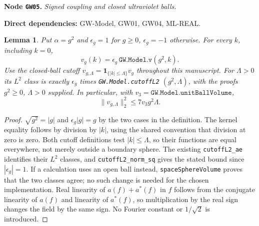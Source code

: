 \documentclass[11pt,a4paper]{article}
\newtheorem{lemma}[theorem]{Lemma}
\theoremstyle{remark}\newtheorem{remark}[theorem]{Remark}
\newcommand{\node}[3]{\par\Needspace{6\baselineskip}\smallskip\hypertarget{node:#1}{}\label{nodepage:#1}\noindent\textbf{Node \texttt{#1}.} \textit{#2.}\par\noindent\textbf{Direct dependencies:} #3.\par}
\begin{document}
\node{GW05}{Signed coupling and closed ultraviolet balls}{GW-Model, GW01, GW04, ML-REAL}
\begin{lemma}\label{lem:gwkerneladapter}
Put $\alpha=g^2$ and $\epsilon_g=1$ for $g\geq0$, $\epsilon_g=-1$ otherwise. For every $k$, including $k=0$,
\[
 v_g(k)=\epsilon_g\,\texttt{GW.Model.v}(g^2,k).
\]
Use the closed-ball cutoff $v_{g,\Lambda}=\mathbf1_{\{|k|\leq\Lambda\}}v_g$ throughout this manuscript. For $\Lambda>0$ its $L^2$ class is exactly $\epsilon_g$ times
\texttt{GW.Model.cutoffL2} $(g^2,\Lambda)$, with the proofs $g^2\geq0$, $\Lambda>0$ supplied. In particular, with $v_3=\texttt{GW.Model.unitBallVolume}$,
\[
 \|v_{g,\Lambda}\|_2^2\leq7v_3g^2\Lambda.
\]
\end{lemma}
\begin{proof}
$\sqrt{g^2}=|g|$ and $\epsilon_g|g|=g$ by the two cases in the definition. The kernel equality follows by division by $|k|$, using the shared convention that division at zero is zero. Both cutoff definitions test $|k|\leq\Lambda$, so their functions are equal everywhere, not merely outside a boundary sphere. The existing \texttt{cutoffL2\_ae} identifies their $L^2$ classes, and \texttt{cutoffL2\_norm\_sq} gives the stated bound since $|\epsilon_g|=1$. If a calculation uses an open ball instead, \texttt{spaceSphereVolume} proves that the two classes agree; no such change is needed for the chosen implementation. Real linearity of $a(f)+a^*(f)$ in $f$ follows from the conjugate linearity of $a(f)$ and linearity of $a^*(f)$, so multiplication by the real sign changes the field by the same sign. No Fourier constant or $1/\sqrt2$ is introduced.
\end{proof}
\end{document}
